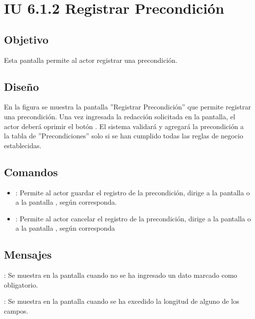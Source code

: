\section{IU 6.1.2 Registrar Precondición}

\subsection{Objetivo}
	Esta pantalla permite al actor registrar una precondición.
\subsection{Diseño}
	En la figura  se muestra la pantalla ''Registrar Precondición'' que permite registrar una precondición. Una vez ingresada la redacción solicitada en la pantalla, el actor deberá oprimir el botón  . El sistema validará y agregará la precondición a la tabla de ''Precondiciones'' solo si se han cumplido todas las reglas de negocio establecidas.

\subsection{Comandos}
\begin{itemize}
	\item {}: Permite al actor guardar el registro de la precondición, dirige a la pantalla  o a la pantalla , según corresponda.
	\item {}: Permite al actor cancelar el registro de la precondición, dirige a la pantalla  o a la pantalla , según corresponda
\end{itemize}

\subsection{Mensajes}

\begin{Citemize}
	\item {}: Se muestra en la pantalla  cuando no se ha ingresado un dato marcado como obligatorio.
	\item {}: Se muestra en la pantalla  cuando se ha excedido la longitud de alguno de los campos.
\end{Citemize}

